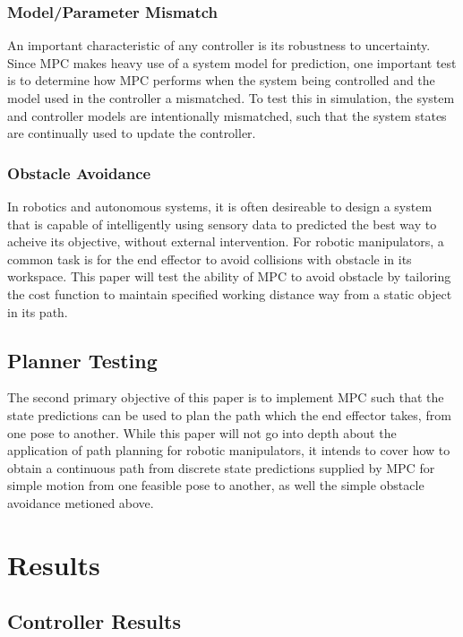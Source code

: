 \documentclass[journal]{IEEEtran}
\begin{document}
\subsubsection{Model/Parameter Mismatch}
An important characteristic of any controller is its robustness to uncertainty. Since MPC makes heavy use of a system model for prediction, one important test is to determine how MPC performs when the system being controlled and the model used in the controller a mismatched. To test this in simulation, the system and controller models are intentionally mismatched, such that the system states are continually used to update the controller.\\

\subsubsection{Obstacle Avoidance}
In robotics and autonomous systems, it is often desireable to design a system that is capable of intelligently using sensory data to predicted the best way to acheive its objective, without external intervention. For robotic manipulators, a common task is for the end effector to avoid collisions with obstacle in its workspace. This paper will test the ability of MPC to avoid obstacle by tailoring the cost function to maintain specified working distance way from a static object in its path.

\subsection{Planner Testing}

The second primary objective of this paper is to implement MPC such that the state predictions can be used to plan the path which the end effector takes, from one pose to another. While this paper will not go into depth about the application of path planning for robotic manipulators, it intends to cover how to obtain a continuous path from discrete state predictions supplied by MPC for simple motion from one feasible pose to another, as well the simple obstacle avoidance metioned above.

\section{Results}


\subsection{Controller Results}
\end{document}
